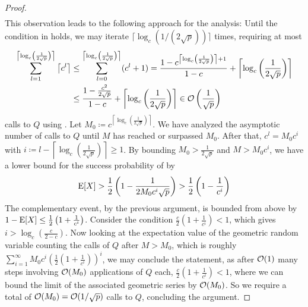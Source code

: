 \begin{proof}
\begin{align}
    \end{align}
    This observation leads to the following approach for the analysis: Until the condition in  holds, we may iterate \(\lceil\log_c(1/(2\sqrt{p}))\rceil\) times, requiring at most
    \begin{align}
        \sum_{l=1}^{\left\lceil \log_c\left(\frac{1}{2\sqrt{p}}\right) \right\rceil} \left\lceil c^l \right\rceil &\leq \sum_{l=0}^{\left\lceil \log_c\left(\frac{1}{2\sqrt{p}}\right) \right\rceil} (c^l + 1) = \frac{1-c^{\left\lceil \log_c\left(\frac{1}{2\sqrt{p}}\right) \right\rceil+1}}{1-c}+\left\lceil \log_c\left(\frac{1}{2\sqrt{p}}\right) \right\rceil\\
        &\leq \frac{1-\frac{c^2}{2\sqrt{p}}}{1-c}+\left\lceil \log_c\left(\frac{1}{2\sqrt{p}}\right) \right\rceil \in \operatorname{\mathcal{O}}\left(\frac{1}{\sqrt{p}}\right)
    \end{align}
    calls to \(Q\) using . Let \(M_0 \coloneqq c^{\left\lceil \log_c\left(\frac{1}{2\sqrt{p}}\right) \right\rceil}\). We have analyzed the asymptotic number of calls to \(Q\) until \(M\) has reached or surpassed \(M_0\). After that, \(c^l = M_0c^i\) with \(i \coloneqq l - \left\lceil \log_c\left(\frac{1}{2\sqrt{p}}\right) \right\rceil \geq 1\). By bounding \(M_0 > \frac{1}{2\sqrt{p}}\) and \(M > M_0c^i\), we have a lower bound for the success probability of  by
    \begin{align}
        \operatorname{E}[X] > \frac{1}{2}\left(1-\frac{1}{2M_0c^{i}\sqrt{p}}\right) > \frac{1}{2}\left(1-\frac{1}{c^i}\right)
    \end{align}
    The complementary event, by the previous argument, is bounded from above by \(1-\operatorname{E}[X] \leq \frac{1}{2}\left(1+\frac{1}{c^i}\right)\). Consider the condition \(\frac{c}{2}\left(1+\frac{1}{c^i}\right) < 1\), which gives \(i > \log_c\left(\frac{c}{2-c}\right)\). Now looking at the expectation value of the geometric random variable counting the calls of \(Q\) after \(M > M_0\), which is roughly \(\sum_{i=1}^\infty M_0c^i \left(\frac{1}{2}\left(1+\frac{1}{c^i}\right)\right)^i\), we may conclude the statement, as after \(\operatorname{\mathcal{O}}(1)\) many steps involving \(\operatorname{\mathcal{O}}(M_0)\) applications of \(Q\) each, \(\frac{c}{2}\left(1+\frac{1}{c^i}\right) < 1\), where we can bound the limit of the associated geometric series by \(\operatorname{\mathcal{O}}(M_0)\). So we require a total of \(\operatorname{\mathcal{O}}(M_0) = \operatorname{\mathcal{O}}(1/\sqrt{p})\) calls to \(Q\), concluding the argument.
\end{proof}


